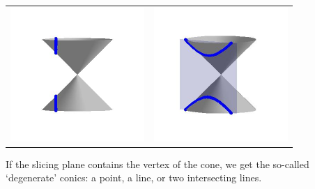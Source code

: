 \begin{center}

\begin{tabular}{cc}

\includegraphics[width=2in]{./IntrotoConicsGraphics/Hyperbola01.jpg} & \includegraphics[width=2in]{./IntrotoConicsGraphics/Hyperbola02.jpg} \\

\end{tabular}

\end{center}


\pagebreak

If the slicing plane contains the vertex of the cone, we get the so-called `degenerate' conics:  a point, a line, or two intersecting lines.  

\label{degenerateconics}

